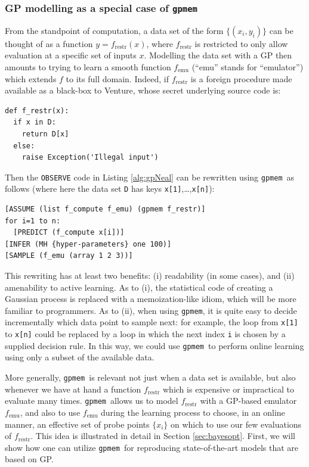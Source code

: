 \documentclass{article} %
\newcommand{\gpmem}{\texttt{gpmem}}
\newcommand{\emu}{{\textrm{emu}}}
\newcommand{\restr}{{\textrm{restr}}}
\begin{document}
\subsubsection{GP modelling as a special case of \gpmem}\label{sec:special-case-gpmem}
From the standpoint of computation, a data set of the form $\{(x_i, y_i)\}$ can be thought of as a function $y = f_\restr(x)$, where $f_\restr$ is restricted to only allow evaluation at a specific set of inputs $x$.
Modelling the data set with a GP then amounts to trying to learn a smooth function $f_\emu$ (``emu'' stands for ``emulator'') which extends $f$ to its full domain.
Indeed, if $f_\restr$ is a foreign procedure made available as a black-box to Venture, whose secret underlying source code is:
\begin{verbatim}
def f_restr(x):
  if x in D:
    return D[x]
  else:
    raise Exception('Illegal input')
\end{verbatim}
Then the \texttt{OBSERVE} code in Listing \ref{alg:gpNeal} can be rewritten using \gpmem\ as follows (where here the data set \texttt{D} has keys \texttt{x[1]},\ldots,\texttt{x[n]}):
\begin{verbatim}
[ASSUME (list f_compute f_emu) (gpmem f_restr)]
for i=1 to n:
  [PREDICT (f_compute x[i])]
[INFER (MH {hyper-parameters} one 100)]
[SAMPLE (f_emu (array 1 2 3))]
\end{verbatim}
This rewriting has at least two benefits: (i) readability (in some cases), and (ii) amenability to active learning.
As to (i), the statistical code of creating a Gaussian process is replaced with a memoization-like idiom, which will be more familiar to programmers.
As to (ii), when using \gpmem, it is quite easy to decide incrementally which data point to sample next: for example, the loop from \texttt{x[1]} to \texttt{x[n]} could be replaced by a loop in which the next index \texttt{i} is chosen by a supplied decision rule.
In this way, we could use \gpmem\ to perform online learning using only a subset of the available data.

More generally, \gpmem\ is relevant not just when a data set is available, but also whenever we have at hand a function $f_\restr$ which is expensive or impractical to evaluate many times.
\gpmem\ allows us to model $f_\restr$ with a GP-based emulator $f_\emu$, and also to use $f_\emu$ during the learning process to choose, in an online manner, an effective set of probe points $\{x_i\}$ on which to use our few evaluations of $f_\restr$.
This idea is illustrated in detail in Section \ref{sec:bayesopt}.
First, we will show how one can utilize \gpmem\ for reproducing state-of-the-art models that are based on GP.
\end{document}
